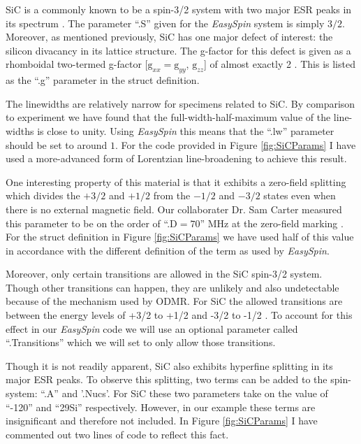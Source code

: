 \documentclass[oneside, noacknowlegments]{BYUPhys}
\begin{document}
SiC is a commonly known to be a spin-3/2 system with two major ESR peaks in its spectrum \cite{RefWorks:doc:5892964ee4b0499fa95c5108}. The parameter ``.S'' given for the \textit{EasySpin} system is simply $3/2$. Moreover, as mentioned previously, SiC has one major defect of interest: the silicon divacancy \cite{RefWorks:doc:58929800e4b0499fa95c51a1} \cite{RefWorks:doc:589297a9e4b0d4c09201f736} in its lattice structure. The g-factor for this defect is given as a rhomboidal two-termed g-factor [$\text{g}_{xx}=\text{g}_{yy}$, $\text{g}_{zz}$] of almost exactly 2 \cite{RefWorks:doc:5892964ee4b0499fa95c5108}. This is listed as the ``.g'' parameter in the struct definition.

The linewidths are relatively narrow for specimens related to SiC. By comparison to experiment we have found that the full-width-half-maximum value of the line-widths is close to unity. Using \textit{EasySpin} this means that the ``.lw'' parameter should be set to around $1$. For the code provided in Figure \ref{fig:SiCParams} I have used a more-advanced form of Lorentzian line-broadening to achieve this result.

One interesting property of this material is that it exhibits a zero-field splitting which divides the $+3/2$ and $+1/2$ from the $-1/2$ and $-3/2$ states even when there is no external magnetic field. Our collaborater Dr. Sam Carter measured this parameter to be on the order of ``.D$=70$'' MHz at the zero-field marking \cite{RefWorks:doc:5892964ee4b0499fa95c5108}. For the struct definition in Figure \ref{fig:SiCParams} we have used half of this value in accordance with the different definition of the term as used by \textit{EasySpin}.

Moreover, only certain transitions are allowed in the SiC spin-3/2 system. Though other transitions can happen, they are unlikely and also undetectable because of the mechanism used by ODMR. For SiC the allowed transitions are between the energy levels of +3/2 to +1/2 and -3/2 to -1/2 \cite{RefWorks:doc:5892964ee4b0499fa95c5108}. To account for this effect in our \textit{EasySpin} code we will use an optional parameter called ``.Transitions'' which we will set to only allow those transitions.

Though it is not readily apparent, SiC also exhibits hyperfine splitting in its major ESR peaks. To observe this splitting, two terms can be added to the spin-system: ``.A'' and '.Nucs'. For SiC these two parameters take on the value of ``-120'' and ``29Si'' respectively. However, in our example these terms are insignificant and therefore not included. In Figure \ref{fig:SiCParams} I have commented out two lines of code to reflect this fact.
 
\end{document}
